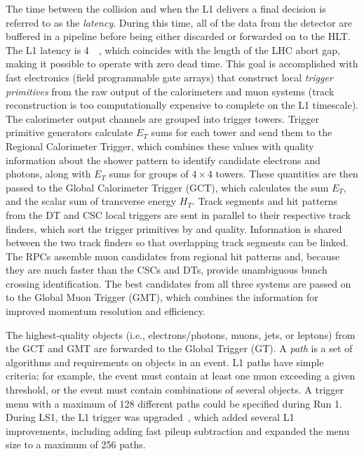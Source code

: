 The time between the collision and when the L1 delivers a final decision is
referred to as the \emph{latency}. During this time, all of the data from the
detector are buffered in a pipeline before being either discarded or forwarded
on to the HLT. The L1 latency is \SI{4}{\micro\sec}, which coincides with the
length of the LHC abort gap, making it possible to operate with zero dead time.
This goal is accomplished with fast electronics (field programmable gate arrays)
that construct local \emph{trigger primitives} from the raw output of the
calorimeters and muon systems (track reconstruction is too computationally
expensive to complete on the L1 timescale). The calorimeter output channels are
grouped into trigger towers. Trigger primitive generators calculate $E_T$ sums
for each tower and send them to the Regional Calorimeter Trigger, which combines
these values with quality information about the shower pattern to identify
candidate electrons and photons, along with $E_T$ sums for groups of $4 \times
4$ towers. These quantities are then passed to the Global Calorimeter Trigger
(GCT), which calculates the sum $E_T$, \pTmiss and the scalar sum of transverse
energy $H_T$. Track segments and hit patterns from the DT and CSC local triggers
are sent in parallel to their respective track finders, which sort the trigger
primitives by \pT and quality. Information is shared between the two track
finders so that overlapping track segments can be linked. The RPCs assemble muon
candidates from regional hit patterns and, because they are much faster than the
CSCs and DTs, provide unambiguous bunch crossing identification. The best
candidates from all three systems are passed on to the Global Muon Trigger
(GMT), which combines the information for improved momentum resolution and
efficiency.

The highest-quality objects (i.e., electrons/photons, muons, jets, or \Ptau
leptons) from the GCT and GMT are forwarded to the Global Trigger (GT). A
\textit{path} is a set of algorithms and requirements on objects in an event. L1
paths have simple criteria; for example, the event must contain at least one
muon exceeding a given threshold, or the event must contain combinations of
several objects. A trigger menu with a maximum of 128 different paths could be
specified during Run 1. During LS1, the L1 trigger was
upgraded~\cite{Tapper:1556311}, which added several L1 improvements, including
adding fast pileup subtraction and expanded the menu size to a maximum of 256
paths.

